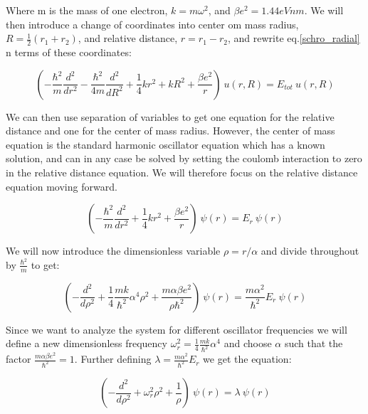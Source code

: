\documentclass[a4paper,11pt]{article}
\begin{document}
{Where m is the mass of one electron, $k = m \omega^2 $, and $ \beta e^2 = 1.44 eVnm$. We will then introduce a change of coordinates into center om mass radius, $ R = \frac{1}{2} (r_1 + r_2) $, and relative distance, $ r = r_1 - r_2 $, and rewrite eq.\ref{schro_radial} n terms of these coordinates:

\begin{equation}
\left(- \frac{\hbar^2}{m}\frac{d^2}{d r^2} - \frac{\hbar^2}{4m}\frac{d^2}{d R^2} + \frac{1}{4}k r^2 + k R^2 + \frac{\beta e^2}{r}\right) \: u(r,R) = E_{tot} \: u(r,R)
\label{schro_radial_CM_rel}
\end{equation}

We can then use separation of variables to get one equation for the relative distance and one for the center of mass radius. However, the center of mass equation is the standard harmonic oscillator equation which has a known solution, and can in any case be solved by setting the coulomb interaction to zero in the relative distance equation. We will therefore focus on the relative distance equation moving forward. 

\begin{equation}
\left(- \frac{\hbar^2}{m}\frac{d^2}{d r^2} + \frac{1}{4}k r^2+ \frac{\beta e^2}{r}\right) \: \psi(r) = E_{r} \: \psi(r)
\label{schro_radial_rel}
\end{equation}

We will now introduce the dimensionless variable $\rho = r/\alpha$ and divide throughout by $\frac{\hbar^2}{m} $ to get:

\begin{equation}
\left(- \frac{d^2}{d \rho^2} + \frac{1}{4}\frac{m k}{\hbar^2} \alpha^4  \rho^2+ \frac{m \alpha \beta e^2}{\rho \hbar^2}\right) \: \psi(r) = \frac{m \alpha^2}{\hbar^2}E_{r} \: \psi(r)
\label{dimless_schro_radial_rel}
\end{equation}

Since we want to analyze the system for different oscillator frequencies we will define a new dimensionless frequency $\omega_r^2 = \frac{1}{4}\frac{m k}{\hbar^2} \alpha^4 $ and choose $\alpha$ such that the factor $\frac{m \alpha \beta e^2}{ \hbar^2} = 1$. Further defining $\lambda = \frac{m \alpha^2}{\hbar^2}E_{r} $ we get the equation:

\begin{equation}
\left(- \frac{d^2}{d \rho^2} + \omega_r^2  \rho^2+ \frac{1}{\rho}\right) \: \psi(r) = \lambda \: \psi(r)
\label{dimless_schro_radial_rel_simple}
\end{equation}

}
\end{document}
